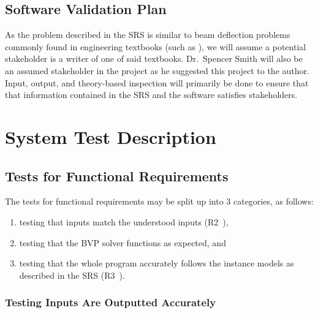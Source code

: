 \documentclass[12pt, titlepage]{article}
\begin{document}
\subsection{Software Validation Plan}

As the problem described in the SRS is similar to beam deflection problems
commonly found in engineering textbooks (such as \cite{BeerJohnston1981}), we
will assume a potential stakeholder is a writer of one of said textbooks.
Dr.~Spencer Smith will also be an assumed stakeholder in the project as he
suggested this project to the author. Input, output, and theory-based inspection
will primarily be done to ensure that that information contained in the SRS and
the software satisfies stakeholders.

\newpage{}

\section{System Test Description}

\subsection{Tests for Functional Requirements}

The tests for functional requirements may be split up into 3 categories, as
follows:

\begin{enumerate}
    
    \item testing that inputs match the understood inputs
          (R2~\cite{BalaciBeamBendingSRS2023}),

    \item testing that the BVP solver functions as expected, and
    
    \item testing that the whole program accurately follows the instance models
          as described in the SRS (R3~\cite{BalaciBeamBendingSRS2023}).
    
\end{enumerate}

\subsubsection{Testing Inputs Are Outputted Accurately}
\end{document}
